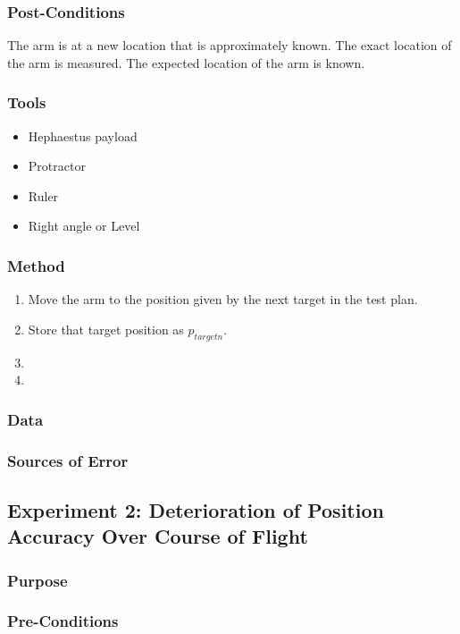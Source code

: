 \documentclass[letterpaper,10pt]{article}
\begin{document}
\subsubsection{Post-Conditions}
The arm is at a new location that is approximately known. The exact location of
the arm is measured. The expected location of the arm is known.

\subsubsection{Tools}
\begin{itemize}
\item{Hephaestus payload}
\item{Protractor}
\item{Ruler}
\item{Right angle or Level}
\end{itemize}

\subsubsection{Method}
\begin{enumerate}
\item{Move the arm to the position given by the next target in the test plan.}
\item{Store that target position as \(p_{target n}\).}
\item{}
\item{}
\end{enumerate}

\subsubsection{Data}
\subsubsection{Sources of Error}

\subsection{Experiment 2: Deterioration of Position Accuracy Over Course of Flight}
\subsubsection{Purpose}
\subsubsection{Pre-Conditions}
\end{document}
